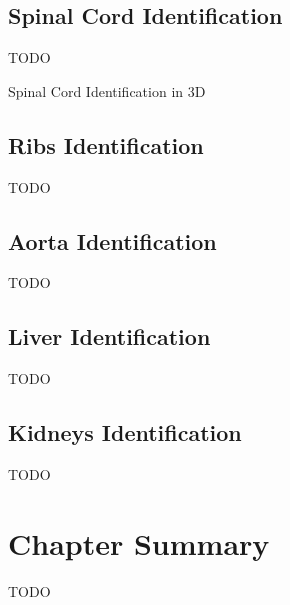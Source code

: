 \subsection{Spinal Cord Identification}

TODO

\begin{stulisting}[p]
\caption{Spinal Cord Identification in 3D}
\label{code:featureid-3d-spinalcordidentification}

\end{stulisting}

\subsection{Ribs Identification}
\label{subsec:featureid-3d-ribsidentification}

TODO

\subsection{Aorta Identification}

TODO

\subsection{Liver Identification}

TODO

\subsection{Kidneys Identification}

TODO

\section{Chapter Summary}

TODO
